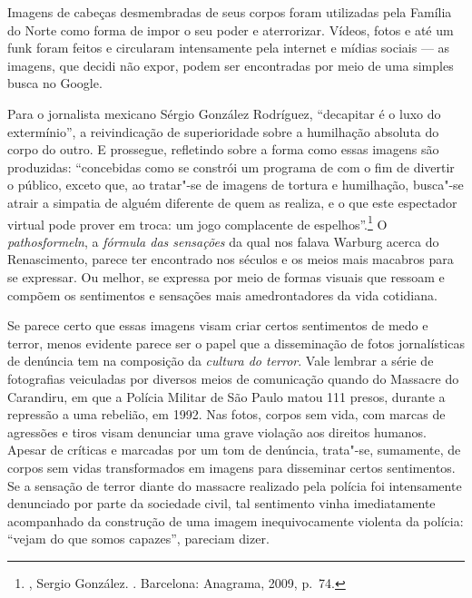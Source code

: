 Imagens de cabeças desmembradas de seus corpos foram utilizadas pela
Família do Norte como forma de impor o seu poder e aterrorizar. Vídeos,
fotos e até um funk foram feitos e circularam intensamente pela internet
e mídias sociais --- as imagens, que decidi não expor, podem ser
encontradas por meio de uma simples busca no Google.

Para o
jornalista mexicano Sérgio González Rodríguez, ``decapitar é o luxo do
extermínio'', a reivindicação de superioridade sobre a humilhação
absoluta do corpo do outro. E prossegue, refletindo sobre a forma como
essas imagens são produzidas: ``concebidas como se constrói um programa
de  com o fim de divertir o público, exceto que, ao tratar"-se de
imagens de tortura e humilhação, busca"-se atrair a simpatia de alguém
diferente de quem as realiza, e o que este espectador virtual pode
prover em troca: um jogo complacente de espelhos''.\footnote{,
  Sergio González. {}. Barcelona: Anagrama,
  2009, p.~74.} O \emph{pathosformeln}, a \emph{fórmula das
sensações} da qual nos falava Warburg acerca do Renascimento, parece ter
encontrado nos séculos  e  os meios mais macabros para se
expressar. Ou melhor, se expressa por meio de formas visuais que
ressoam e compõem os sentimentos e sensações mais amedrontadores da
vida cotidiana.

Se parece certo que essas imagens visam criar certos sentimentos de medo
e terror, menos evidente parece ser o papel que a disseminação de fotos
jornalísticas de denúncia tem na composição da \emph{cultura do terror}.
Vale lembrar a série de fotografias veiculadas por diversos meios de
comunicação quando do Massacre do Carandiru, em que a Polícia Militar de
São Paulo matou 111 presos, durante a repressão a uma rebelião, em 1992. Nas
fotos, corpos sem vida, com marcas de agressões e tiros visam denunciar
uma grave violação aos direitos humanos. Apesar de críticas e marcadas
por um tom de denúncia, trata"-se, sumamente, de corpos sem vidas
transformados em imagens para disseminar certos sentimentos. Se a
sensação de terror diante do massacre realizado pela polícia foi
intensamente denunciado por parte da sociedade civil, tal sentimento
vinha imediatamente acompanhado da construção de uma imagem
inequivocamente violenta da polícia: ``vejam do que somos capazes'',
pareciam dizer.


\asterisc

